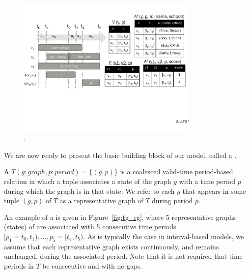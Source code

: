 \begin{figure}
\centering
\includegraphics[width=3.5in]{figs/T1_rel_tab.pdf}
\caption{\tg {}.}
\label{fig:tg_ve}
\end{figure}



We are now ready to present the basic building block of our model,
called a \tg.  

\begin{definition}[TGraph]
A \tg $T(g:graph, p:period) = \{ (g,p) \}$ is a coalesced valid-time
period-based relation in which a tuple associates a state of the graph
$g$ with a time period $p$ during which the graph is in that state.
We refer to each $g$ that appears in some tuple $(g,p)$ of $T$ as a
representative graph of $T$ during period $p$.
\label{def:tg_abstract}
\end{definition}

An example of a \tg is given in Figure~\ref{fig:tg_rg}, where 5
representative graphs (states) of  are associated with 5
consecutive time periods $[p_1=t_0,t_1), \ldots, p_5=[t_4,t_5)$.  As
    is typically the case in interval-based models, we assume that
    each representative graph exists continuously, and remains
    unchanged, during the associated period.  Note that it is not
    required that time periods in $T$ be consecutive and with no gaps.

